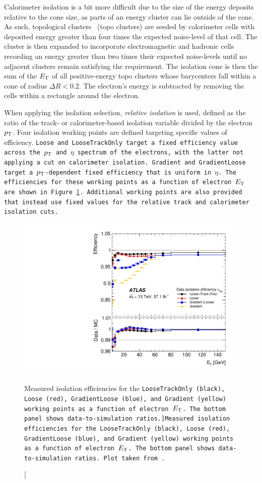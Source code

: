 Calorimeter isolation is a bit more difficult due to the size of the energy deposits relative to the cone size, as parts of an energy cluster can lie outside of the cone.
As such, topological clusters~\cite{2017.topo-clustering} (topo clusters) are seeded by calorimeter cells with deposited energy greater than four times the expected noise-level of that cell.
The cluster is then expanded to incorporate electromagnetic and hadronic cells recording an energy greater than two times their expected noise-levels until no adjacent clusters remain satisfying the requirement.
The isolation cone is then the sum of the $E_{\mathrm{T}}$ of all positive-energy topo clusters whose barycenters fall within a cone of radius $\Delta R < 0.2$.
The electron's energy is subtracted by removing the cells within a rectangle around the electron.

When applying the isolation selection, \emph{relative isolation} is used, defined as the ratio of the track- or calorimeter-based isolation variable divided by the electron $p_{\mathrm{T}}$.
Four isolation working points are defined targeting specific values of efficiency.
\tt{Loose} and \tt{LooseTrackOnly} target a fixed efficiency value across the $p_{\mathrm{T}}$ and $\eta$ spectrum of the electrons, with the latter not applying a cut on calorimeter isolation.
\tt{Gradient} and \tt{GradientLoose} target a $p_{\mathrm{T}}$-dependent fixed efficiency that is uniform in $\eta$.
The efficiencies for these working points as a function of electron $E_{\mathrm{T}}$ are shown in Figure~\ref{fig:electron_iso_efficiency}.
Additional working points are also provided that instead use fixed values for the relative track and calorimeter isolation cuts.

\begin{figure}[htbp]
  \centering
  \includegraphics[width=.6\textwidth]{figs/detector/electron_iso_efficiency}
  \caption[Measured isolation efficiencies for the \tt{LooseTrackOnly} (black), \tt{Loose} (red), \tt{GradientLoose} (blue), and \tt{Gradient} (yellow) working points as a function of electron $E_{\mathrm{T}}$.  The bottom panel shows data-to-simulation ratios.]{Measured isolation efficiencies for the \tt{LooseTrackOnly} (black), \tt{Loose} (red), \tt{GradientLoose} (blue), and \tt{Gradient} (yellow) working points as a function of electron $E_{\mathrm{T}}$.  The bottom panel shows data-to-simulation ratios.  Plot taken from~\cite{2019.electron-reco-id}.}
  \label{fig:electron_iso_efficiency}
\end{figure}

